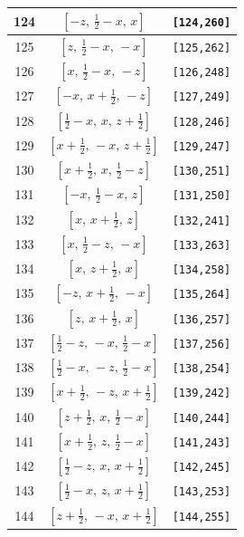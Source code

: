 \documentclass[fleqn,8pt]{jsarticle}
\begin{document}
\begin{longtable}{ccc}
124 & $\left[ - z,\, \frac{1}{2} - x,\, x \right]$ & {\tt [124,260]} \\ \hline
125 & $\left[ z,\, \frac{1}{2} - x,\, - x \right]$ & {\tt [125,262]} \\ \hline
126 & $\left[ x,\, \frac{1}{2} - x,\, - z \right]$ & {\tt [126,248]} \\ \hline
127 & $\left[ - x,\, x + \frac{1}{2},\, - z \right]$ & {\tt [127,249]} \\ \hline
128 & $\left[ \frac{1}{2} - x,\, x,\, z + \frac{1}{2} \right]$ & {\tt [128,246]} \\ \hline
129 & $\left[ x + \frac{1}{2},\, - x,\, z + \frac{1}{2} \right]$ & {\tt [129,247]} \\ \hline
130 & $\left[ x + \frac{1}{2},\, x,\, \frac{1}{2} - z \right]$ & {\tt [130,251]} \\ \hline
131 & $\left[ - x,\, \frac{1}{2} - x,\, z \right]$ & {\tt [131,250]} \\ \hline
132 & $\left[ x,\, x + \frac{1}{2},\, z \right]$ & {\tt [132,241]} \\ \hline
133 & $\left[ x,\, \frac{1}{2} - z,\, - x \right]$ & {\tt [133,263]} \\ \hline
134 & $\left[ x,\, z + \frac{1}{2},\, x \right]$ & {\tt [134,258]} \\ \hline
135 & $\left[ - z,\, x + \frac{1}{2},\, - x \right]$ & {\tt [135,264]} \\ \hline
136 & $\left[ z,\, x + \frac{1}{2},\, x \right]$ & {\tt [136,257]} \\ \hline
137 & $\left[ \frac{1}{2} - z,\, - x,\, \frac{1}{2} - x \right]$ & {\tt [137,256]} \\ \hline
138 & $\left[ \frac{1}{2} - x,\, - z,\, \frac{1}{2} - x \right]$ & {\tt [138,254]} \\ \hline
139 & $\left[ x + \frac{1}{2},\, - z,\, x + \frac{1}{2} \right]$ & {\tt [139,242]} \\ \hline
140 & $\left[ z + \frac{1}{2},\, x,\, \frac{1}{2} - x \right]$ & {\tt [140,244]} \\ \hline
141 & $\left[ x + \frac{1}{2},\, z,\, \frac{1}{2} - x \right]$ & {\tt [141,243]} \\ \hline
142 & $\left[ \frac{1}{2} - z,\, x,\, x + \frac{1}{2} \right]$ & {\tt [142,245]} \\ \hline
143 & $\left[ \frac{1}{2} - x,\, z,\, x + \frac{1}{2} \right]$ & {\tt [143,253]} \\ \hline
144 & $\left[ z + \frac{1}{2},\, - x,\, x + \frac{1}{2} \right]$ & {\tt [144,255]} \\ \hline

\end{longtable}
\end{document}
